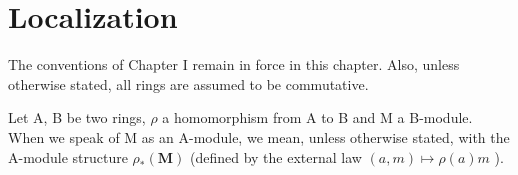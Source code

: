 \chapter{Localization}

The conventions of Chapter I remain in force in this chapter. Also, unless otherwise stated, all rings are assumed to be commutative.

Let A, B be two rings, \(\rho\) a homomorphism from A to B and M a B-module. When we speak of M as an A-module, we mean, unless otherwise stated, with the A-module structure \(\rho_{*}(\mathbf{M})\) (defined by the external law \((a,m)\mapsto\rho(a)m\) ).

